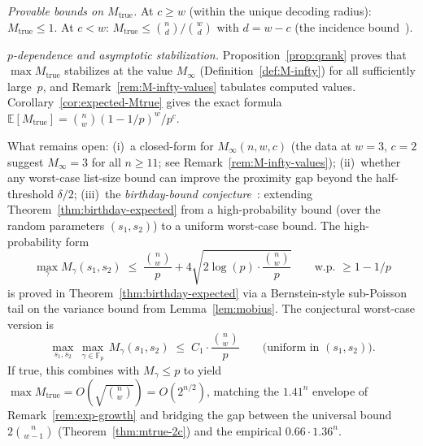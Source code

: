 \documentclass[11pt]{article}
\newcommand{\FF}{\mathbb{F}}
\newcommand{\EE}{\mathbb{E}}
\begin{document}
\begin{enumerate}
\emph{Provable bounds on $M_{\mathrm{true}}$.}
At $c \geq w$ (within the unique decoding radius): $M_{\mathrm{true}} \leq 1$.
At $c < w$: $M_{\mathrm{true}} \leq \binom{n}{d}/\binom{w}{d}$ with $d = w - c$ (the incidence bound~\cite{Note0088}).

\emph{$p$-dependence and asymptotic stabilization.} Proposition~\ref{prop:qrank} proves that $\max M_{\mathrm{true}}$ stabilizes at the value $M_\infty$ (Definition~\ref{def:M-infty}) for all sufficiently large~$p$, and Remark~\ref{rem:M-infty-values} tabulates computed values. Corollary~\ref{cor:expected-Mtrue} gives the exact formula $\EE[M_{\mathrm{true}}] = \binom{n}{w}(1-1/p)^w/p^c$.

What remains open: (i)~a closed-form for $M_\infty(n, w, c)$ (the data at $w = 3$, $c = 2$ suggest $M_\infty = 3$ for all $n \geq 11$; see Remark~\ref{rem:M-infty-values}); (ii)~whether any worst-case list-size bound can improve the proximity gap beyond the half-threshold $\delta/2$; (iii)~the \emph{birthday-bound conjecture}~\label{op:birthday}: extending Theorem~\ref{thm:birthday-expected} from a high-probability bound (over the random parameters $(s_1, s_2)$) to a uniform worst-case bound. The high-probability form
\[
   \max_\gamma M_\gamma(s_1, s_2) \;\leq\; \frac{\binom{n}{w}}{p} + 4\sqrt{2\log(p) \cdot \frac{\binom{n}{w}}{p}}
   \qquad \text{w.p.\ } \geq 1 - 1/p
\]
is proved in Theorem~\ref{thm:birthday-expected} via a Bernstein-style sub-Poisson tail on the variance bound from Lemma~\ref{lem:mobius}. The conjectural worst-case version is
\[
   \max_{s_1, s_2}\, \max_{\gamma \in \FF_p}\, M_\gamma(s_1, s_2) \;\leq\; C_1 \cdot \frac{\binom{n}{w}}{p}
   \qquad \text{(uniform in $(s_1, s_2)$).}
\]
If true, this combines with $M_\gamma \leq p$ to yield $\max M_{\mathrm{true}} = O(\sqrt{\binom{n}{w}}) = O(2^{n/2})$, matching the $1.41^n$ envelope of Remark~\ref{rem:exp-growth} and bridging the gap between the universal bound $2\binom{n}{w-1}$ (Theorem~\ref{thm:mtrue-2c}) and the empirical $0.66 \cdot 1.36^n$.


\end{enumerate}
\end{document}
